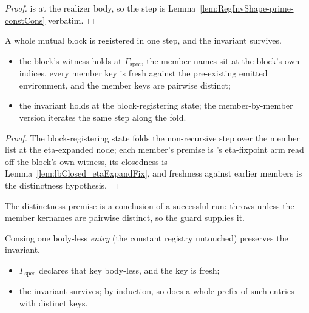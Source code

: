\begin{proof}
\leanok
{}
  is  at the realizer body, so the step is
Lemma~\ref{lem:RegInvShape-prime-constCons} verbatim.
\end{proof}
\begin{lemma}
\label{lem:RegInvShape-prime-recConst}
\leanok
{}
 A whole mutual block is registered in one step, and the invariant survives.
\begin{itemize}
\item {} the block's  witness holds at $\Gamma_{\mathrm{spec}}$, the member
names sit at the block's own indices, every member key is fresh against the pre-existing emitted
environment, and the member keys are pairwise distinct;
\item {} the invariant holds at the block-registering state; the member-by-member version
iterates the same step along the fold.
\end{itemize}
\end{lemma}
\begin{proof}
\leanok
{}
 The block-registering state folds the non-recursive step over the member list at the
eta-expanded node; each member's \Lower{} premise is \Lower{}'s eta-fixpoint arm read off the block's own
 witness, its closedness is Lemma~\ref{lem:lbClosed_etaExpandFix}, and freshness against
earlier members is the distinctness hypothesis.
\end{proof}
\begin{remark}
 The distinctness premise is a conclusion of a successful run: 
throws unless the member kernames are pairwise distinct, so the guard supplies it.
\end{remark}
\begin{lemma}
\label{lem:RegInvShape-prime-axiomCons}
\leanok
{}
 Consing one body-less \emph{entry} (the constant registry untouched) preserves the
invariant.
\begin{itemize}
\item {} $\Gamma_{\mathrm{spec}}$ declares that key body-less, and the key is fresh;
\item {} the invariant survives; by induction, so does a whole prefix of such entries with
distinct keys.
\end{itemize}
\end{lemma}
